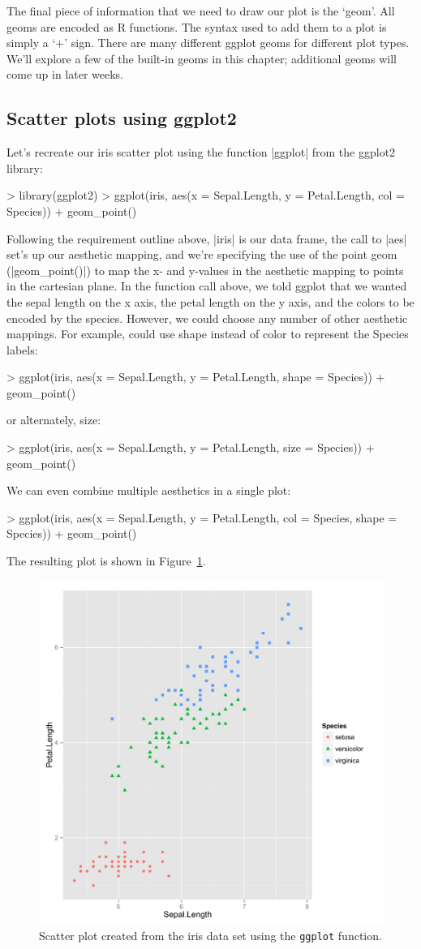The final piece of information that we need to draw our plot is the `geom'. All geoms are encoded as R functions. The syntax used to add them to a plot is simply a `+' sign.  There are many different ggplot geoms for different plot types. We'll explore a few of the built-in geoms in this chapter; additional geoms will come up in later weeks.


\subsection{Scatter plots using ggplot2}

Let's recreate our iris scatter plot using the function |ggplot| from the ggplot2 library:
\begin{R}
> library(ggplot2)
> ggplot(iris, aes(x = Sepal.Length, y = Petal.Length, 
                col = Species)) + geom_point()
\end{R}
%
Following the requirement outline above, |iris| is our data frame, the call to |aes| set's up our aesthetic mapping, and we're specifying the use of the point geom (|geom_point()|) to map the x- and y-values in the aesthetic mapping to points in the cartesian plane. In the function call above, we told ggplot that we wanted the sepal length on the x axis, the petal length on the y axis, and the colors to be encoded by the species. However, we could choose any number of other aesthetic mappings. For example, could use shape instead of color to represent the Species labels:
\begin{R}
> ggplot(iris, aes(x = Sepal.Length, y = Petal.Length, 
                shape = Species)) + geom_point()
\end{R}
%
or alternately, size:
%
\begin{R}
> ggplot(iris, aes(x = Sepal.Length, y = Petal.Length, 
                size = Species)) + geom_point()
\end{R}
%
We can even combine multiple aesthetics in a single plot:
%
\begin{R}
> ggplot(iris, aes(x = Sepal.Length, y = Petal.Length, 
                col = Species, shape = Species)) + geom_point()
\end{R}
The resulting plot is shown in Figure~\ref{fig:ggplotscatter}.
%
\begin{figure}[htbp]
\centering
\includegraphics[width=0.5\columnwidth]{./figures/hands-on2/ggplot-scatter.pdf}
\caption{Scatter plot created from the iris data set using the \lstinline!ggplot! function.}
\label{fig:ggplotscatter}
\end{figure}


